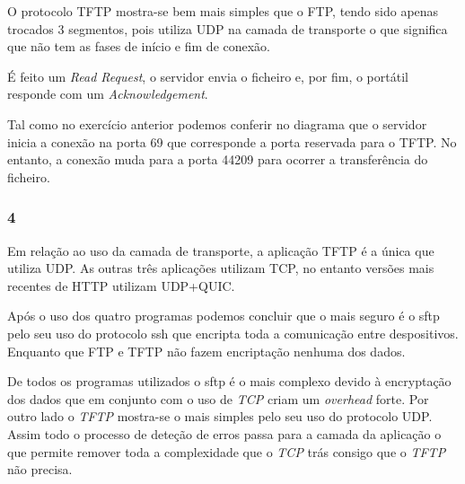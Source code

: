 \documentclass{article}
\begin{document}
                    O protocolo TFTP mostra-se bem mais simples que o FTP, tendo sido apenas trocados 3 segmentos, pois utiliza UDP na camada de transporte o que significa que não tem as fases de início e fim de conexão.

                    É feito um \textit{Read Request}, o servidor envia o ficheiro e, por fim, o portátil responde com um \textit{Acknowledgement}.

                    Tal como no exercício anterior podemos conferir no diagrama que o servidor inicia a conexão na porta 69 que corresponde a porta reservada para o TFTP. No entanto, a conexão muda para a porta 44209 para ocorrer a transferência do ficheiro.
            \clearpage
            \subsubsection*{4}
		            Em relação ao uso da camada de transporte, a aplicação TFTP é a única que utiliza UDP. As outras três aplicações utilizam TCP, no entanto versões mais recentes de HTTP utilizam UDP+QUIC.

                    Após o uso dos quatro programas podemos concluir que o mais seguro é o sftp pelo seu uso do protocolo ssh que encripta toda a comunicação entre despositivos. Enquanto que FTP e TFTP não fazem encriptação nenhuma dos dados.

                    De todos os programas utilizados o sftp é o mais complexo devido à encryptação dos dados que em conjunto com o uso de \textit{TCP} criam um \textit{overhead} forte. Por outro lado o \textit{TFTP} mostra-se o mais simples 
                pelo seu uso do protocolo UDP. Assim todo o processo de deteção de erros passa para a camada da aplicação o que permite remover toda a complexidade que o \textit{TCP} trás consigo que o \textit{TFTP} não precisa.
\end{document}
